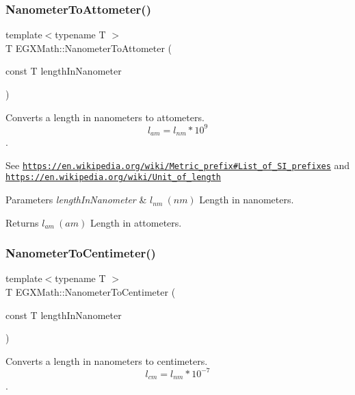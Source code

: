 \subsubsection{\texorpdfstring{Nanometer\+To\+Attometer()}{NanometerToAttometer()}}
{\footnotesize\ttfamily template$<$typename T $>$ \\
T E\+G\+X\+Math\+::\+Nanometer\+To\+Attometer (\begin{DoxyParamCaption}\item[{const T}]{length\+In\+Nanometer }\end{DoxyParamCaption})}



Converts a length in nanometers to attometers. \[ l_{am}=l_{nm} * 10^{9} \]. 

See \href{https://en.wikipedia.org/wiki/Metric_prefix#List_of_SI_prefixes}{\tt https\+://en.\+wikipedia.\+org/wiki/\+Metric\+\_\+prefix\#\+List\+\_\+of\+\_\+\+S\+I\+\_\+prefixes} and \href{https://en.wikipedia.org/wiki/Unit_of_length}{\tt https\+://en.\+wikipedia.\+org/wiki/\+Unit\+\_\+of\+\_\+length} 
\begin{DoxyParams}{Parameters}
{\em length\+In\+Nanometer} & $ l_{nm}\ (nm)$ Length in nanometers. \\
\hline
\end{DoxyParams}
\begin{DoxyReturn}{Returns}
$ l_{am}\ (am)$ Length in attometers. 
\end{DoxyReturn}
\mbox{\label{group___e_g_x_math-_conversions-_length_conversions-_nanometer-_s_i_ga8c37dcaf6ef783c2cf44af0f65633841}} 
\subsubsection{\texorpdfstring{Nanometer\+To\+Centimeter()}{NanometerToCentimeter()}}
{\footnotesize\ttfamily template$<$typename T $>$ \\
T E\+G\+X\+Math\+::\+Nanometer\+To\+Centimeter (\begin{DoxyParamCaption}\item[{const T}]{length\+In\+Nanometer }\end{DoxyParamCaption})}



Converts a length in nanometers to centimeters. \[ l_{cm}=l_{nm} * 10^{-7} \]. 

